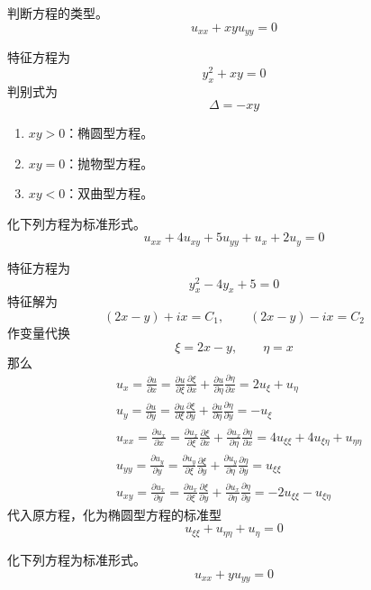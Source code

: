 \documentclass[lang = cn, scheme = chinese, thmcnt = section]{elegantbook}
\begin{document}
\begin{example}
	判断方程的类型。
	$$
	u_{xx}+xyu_{yy}=0
	$$
\end{example}

\begin{solution}
	特征方程为
	$$
	y_x^2+xy=0
	$$
	判别式为
	$$
	\Delta =-xy
	$$
	\begin{enumerate}
		\item $xy>0$​：椭圆型方程。
		\item $xy=0$​：抛物型方程。
		\item $xy<0$​：双曲型方程。
	\end{enumerate}
\end{solution}

\begin{example}
	化下列方程为标准形式。%
	$$
	u_{xx}+4u_{xy}+5u_{yy}+u_x+2u_y=0
	$$
\end{example}

\begin{solution}
	特征方程为
	$$
	y_x^2-4y_x+5=0
	$$
	特征解为
	$$
	(2x-y)+ix=C_1,\qquad 
	(2x-y)-ix=C_2
	$$
	作变量代换
	$$
	\xi=2x-y,\qquad 
	\eta=x
	$$
	那么
	\begin{align*}
		& u_x=\frac{\partial u}{\partial x}=\frac{\partial u}{\partial \xi}\frac{\partial \xi}{\partial x}+\frac{\partial u}{\partial \eta}\frac{\partial \eta}{\partial x}=2u_{\xi}+u_{\eta}\\
		& u_y=\frac{\partial u}{\partial y}=\frac{\partial u}{\partial \xi}\frac{\partial \xi}{\partial y}+\frac{\partial u}{\partial \eta}\frac{\partial \eta}{\partial y}=-u_{\xi}\\
		& u_{xx}=\frac{\partial u_x}{\partial x}=\frac{\partial u_x}{\partial \xi}\frac{\partial \xi}{\partial x}+\frac{\partial u_x}{\partial \eta}\frac{\partial \eta}{\partial x}=4u_{\xi\xi}+4u_{\xi\eta}+u_{\eta\eta}\\
		& u_{yy}=\frac{\partial u_y}{\partial y}=\frac{\partial u_y}{\partial \xi}\frac{\partial \xi}{\partial y}+\frac{\partial u_y}{\partial \eta}\frac{\partial \eta}{\partial y}=u_{\xi\xi}\\
		& u_{xy}=\frac{\partial u_x}{\partial y}=\frac{\partial u_x}{\partial \xi}\frac{\partial \xi}{\partial y}+\frac{\partial u_x}{\partial \eta}\frac{\partial \eta}{\partial y}=-2u_{\xi\xi}-u_{\xi\eta}
	\end{align*}
	代入原方程，化为椭圆型方程的标准型
	$$
	u_{\xi\xi}+u_{\eta\eta}+u_{\eta}=0
	$$
\end{solution}

\begin{example}
	化下列方程为标准形式。%
	$$
	u_{xx}+yu_{yy}=0
	$$
\end{example}
\end{document}
